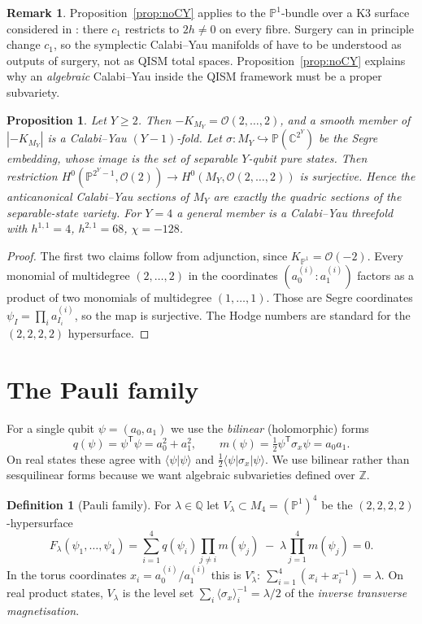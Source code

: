 \documentclass[11pt]{amsart}
\newtheorem{proposition}[theorem]{Proposition}
\theoremstyle{definition}
\newtheorem{definition}[theorem]{Definition}
\newtheorem{remark}[theorem]{Remark}
\newcommand{\Q}{\mathbb{Q}}
\newcommand{\Z}{\mathbb{Z}}
\newcommand{\PP}{\mathbb{P}}
\begin{document}
\begin{remark}
Proposition~\ref{prop:noCY} applies to the $\PP^1$-bundle over a K3 surface considered in \cite[\S4]{BN25}: there $c_1$ restricts to $2h\ne0$ on every fibre. Surgery can in principle change $c_1$, so the symplectic Calabi--Yau manifolds of \cite{BN25} have to be understood as outputs of surgery, not as QISM total spaces. Proposition~\ref{prop:noCY} explains why an \emph{algebraic} Calabi--Yau inside the QISM framework must be a proper subvariety.
\end{remark}

\begin{proposition}\label{prop:segre}
Let $Y\ge2$. Then $-K_{M_Y}=\mathcal{O}(2,\dots,2)$, and a smooth member of $|-K_{M_Y}|$ is a Calabi--Yau $(Y-1)$-fold. Let $\sigma:M_Y\hookrightarrow\PP(\mathbb{C}^{2^Y})$ be the Segre embedding, whose image is the set of separable $Y$-qubit pure states. Then restriction $H^0(\PP^{2^Y-1},\mathcal O(2))\to H^0(M_Y,\mathcal O(2,\dots,2))$ is surjective. Hence the anticanonical Calabi--Yau sections of $M_Y$ are exactly the quadric sections of the separable-state variety. For $Y=4$ a general member is a Calabi--Yau threefold with $h^{1,1}=4$, $h^{2,1}=68$, $\chi=-128$.
\end{proposition}

\begin{proof}
The first two claims follow from adjunction, since $K_{\PP^1}=\mathcal O(-2)$. Every monomial of multidegree $(2,\dots,2)$ in the coordinates $(a^{(i)}_0:a^{(i)}_1)$ factors as a product of two monomials of multidegree $(1,\dots,1)$. Those are Segre coordinates $\psi_I=\prod_i a^{(i)}_{I_i}$, so the map is surjective. The Hodge numbers are standard for the $(2,2,2,2)$ hypersurface.
\end{proof}

\section{The Pauli family}

For a single qubit $\psi=(a_0,a_1)$ we use the \emph{bilinear} (holomorphic) forms
\[ q(\psi)=\psi^{\mathsf T}\psi=a_0^2+a_1^2,\qquad m(\psi)=\tfrac12\psi^{\mathsf T}\sigma_x\psi=a_0a_1. \]
On real states these agree with $\langle\psi|\psi\rangle$ and $\tfrac12\langle\psi|\sigma_x|\psi\rangle$. We use bilinear rather than sesquilinear forms because we want algebraic subvarieties defined over $\Z$.

\begin{definition}[Pauli family]
For $\lambda\in\Q$ let $V_\lambda\subset M_4=(\PP^1)^4$ be the $(2,2,2,2)$-hypersurface
\[ F_\lambda(\psi_1,\dots,\psi_4)=\sum_{i=1}^4 q(\psi_i)\prod_{j\ne i}m(\psi_j)\;-\;\lambda\prod_{j=1}^4 m(\psi_j)=0. \]
In the torus coordinates $x_i=a^{(i)}_0/a^{(i)}_1$ this is $V_\lambda^\circ:\ \sum_{i=1}^4(x_i+x_i^{-1})=\lambda$. On real product states, $V_\lambda$ is the level set $\sum_i\langle\sigma_x\rangle_i^{-1}=\lambda/2$ of the \emph{inverse transverse magnetisation}.
\end{definition}
\end{document}
